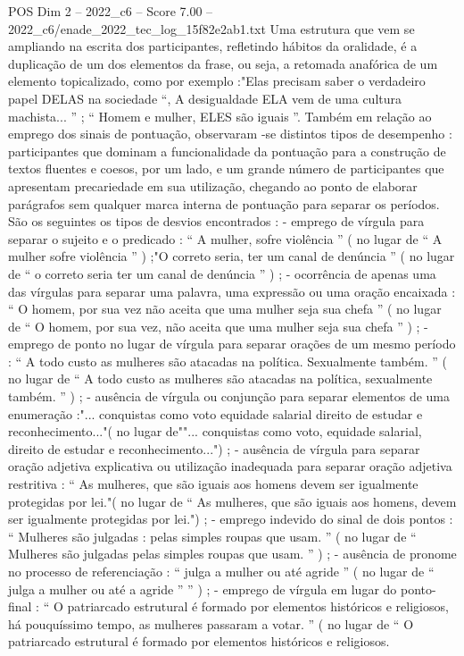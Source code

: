 \begin{textsample}{POS Dim 2 – 2022\_c6 – Score 7.00 – 2022\_c6/enade\_2022\_tec\_log\_15f82e2ab1.txt}
Uma estrutura que vem se ampliando na escrita dos participantes, refletindo hábitos da oralidade, é a duplicação de um dos elementos da frase, ou seja, a retomada anafórica de um elemento topicalizado, como por exemplo :"Elas precisam saber o verdadeiro papel DELAS na sociedade “, A desigualdade ELA vem de uma cultura machista... ” ; “ Homem e mulher, ELES são iguais ”.
Também em relação ao emprego dos sinais de pontuação, observaram -se distintos tipos de desempenho : participantes que dominam a funcionalidade da pontuação para a construção de textos fluentes e coesos, por um lado, e um grande número de participantes que apresentam precariedade em sua utilização, chegando ao ponto de elaborar parágrafos sem qualquer marca interna de pontuação para separar os períodos.
São os seguintes os tipos de desvios encontrados : - emprego de vírgula para separar o sujeito e o predicado : “ A mulher, sofre violência ” ( no lugar de “ A mulher sofre violência ” ) ;"O correto seria, ter um canal de denúncia ” ( no lugar de “ o correto seria ter um canal de denúncia ” ) ; - ocorrência de apenas uma das vírgulas para separar uma palavra, uma expressão ou uma oração encaixada : “ O homem, por sua vez não aceita que uma mulher seja sua chefa ” ( no lugar de “ O homem, por sua vez, não aceita que uma mulher seja sua chefa ” ) ; - emprego de ponto no lugar de vírgula para separar orações de um mesmo período : “ A todo custo as mulheres são atacadas na política.
Sexualmente também. ” ( no lugar de “ A todo custo as mulheres são atacadas na política, sexualmente também. ” ) ; - ausência de vírgula ou conjunção para separar elementos de uma enumeração :"... conquistas como voto equidade salarial direito de estudar e reconhecimento..."( no lugar de""... conquistas como voto, equidade salarial, direito de estudar e reconhecimento...") ; - ausência de vírgula para separar oração adjetiva explicativa ou utilização inadequada para separar oração adjetiva restritiva : “ As mulheres, que são iguais aos homens devem ser igualmente protegidas por lei."( no lugar de “ As mulheres, que são iguais aos homens, devem ser igualmente protegidas por lei.") ; - emprego indevido do sinal de dois pontos : “ Mulheres são julgadas : pelas simples roupas que usam. ” ( no lugar de “ Mulheres são julgadas pelas simples roupas que usam. ” ) ; - ausência de pronome no processo de referenciação : “ julga a mulher ou até agride ” ( no lugar de “ julga a mulher ou até a agride ” ” ) ; - emprego de vírgula em lugar do ponto-final : “ O patriarcado estrutural é formado por elementos históricos e religiosos, há pouquíssimo tempo, as mulheres passaram a votar. ” ( no lugar de “ O patriarcado estrutural é formado por elementos históricos e religiosos.

\end{textsample}

